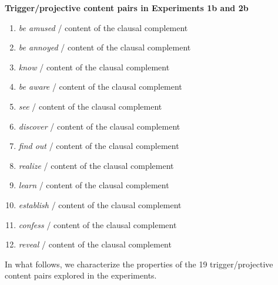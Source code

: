 \documentclass[11pt,fleqn]{article}
\newcommand{\6}{\mbox{$[\hspace*{-.6mm}[$}}
\newcommand{\9}{\mbox{$]\hspace*{-.6mm}]$}}
\begin{document}
\begin{exe}
\begin{enumerate}[itemsep=-.5mm]
\end{enumerate}


\ex\label{pairs1b2b} {\bf Trigger/projective content pairs in Experiments 1b and 2b}

\begin{enumerate}[itemsep=-.5mm]

\item {\em be amused} / content of the clausal complement

\item {\em be annoyed} / content of the clausal complement

\item {\em know} / content of the clausal complement

\item {\em be aware} / content of the clausal complement

\item {\em see} / content of the clausal complement

\item {\em discover} / content of the clausal complement

\item {\em find out} / content of the clausal complement

\item {\em realize} / content of the clausal complement

\item {\em learn} / content of the clausal complement

\item {\em establish} / content of the clausal complement

\item {\em confess} / content of the clausal complement

\item {\em reveal} / content of the clausal complement

\end{enumerate}

\end{exe}

In what follows, we characterize the properties of the 19 trigger/projective content pairs explored in the experiments.
\end{document}
